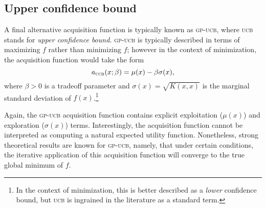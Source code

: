 \documentclass{article}
\newcommand{\acro}[1]{\textsc{\MakeLowercase{#1}}}
\begin{document}
\subsection*{Upper confidence bound}

A final alternative acquisition function is typically known as
\acro{GP-UCB}, where \acro{UCB} stands for \emph{upper confidence
  bound.}  \acro{GP-UCB} is typically described in terms of maximizing
$f$ rather than minimizing $f$; however in the context of minimization,
the acquisition function would take the form
\[
  a_{\text{\acro{UCB}}}(x; \beta)
  =
  \mu(x)
  -
  \beta
  \sigma(x),
\]
where $\beta > 0$ is a tradeoff parameter and $\sigma(x) = \sqrt{K(x,
  x)}$ is the marginal standard deviation of $f(x)$.\footnote{In the
  context of minimization, this is better described as a \emph{lower}
  confidence bound, but \acro{UCB} is ingrained in the literature as a
  standard term.}

Again, the \acro{GP-UCB} acquisition function contains explicit
exploitation ($\mu(x)$) and exploration ($\sigma(x)$) terms.
Interestingly, the acquisition function cannot be interpreted as
computing a natural expected utility function.  Nonetheless, strong
theoretical results are known for \acro{GP-UCB}, namely, that under
certain conditions, the iterative application of this acquisition
function will converge to the true global minimum of $f$.
\end{document}

